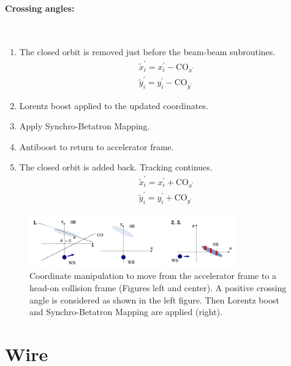 \paragraph{Crossing angles:}~\\
\begin{enumerate}
    \item The closed orbit is removed just before the beam-beam subroutines.
        \begin{eqnarray*}
            \tilde x^{\prime}_{i} = x^{\prime}_{i} - \mathrm{CO}_{x^{\prime}} \\
            \tilde y^{\prime}_{i} = y^{\prime}_{i} - \mathrm{CO}_{y^{\prime}}
        \end{eqnarray*}
    \item Lorentz boost applied to the updated coordinates.
    \item Apply Synchro-Betatron Mapping.
    \item Antiboost to return to accelerator frame.
    \item The closed orbit is added back. Tracking continues.
        \begin{eqnarray*}
            \tilde x^{\prime}_{i} = x^{\prime}_{i} + \mathrm{CO}_{x^{\prime}} \\
            \tilde y^{\prime}_{i} = y^{\prime}_{i} + \mathrm{CO}_{y^{\prime}}
        \end{eqnarray*}
\end{enumerate}
\begin{figure}[h]
    \begin{center}
    \includegraphics[width=0.8\textwidth]{figures/BB_xsing}
    \caption{Coordinate manipulation to move from the accelerator frame to a head-on collision frame (Figures left and center). A positive crossing angle is considered as shown in the left figure. Then Lorentz boost and Synchro-Betatron Mapping are applied (right).}
    \label{fig:BB_xsing}
    \end{center}
\end{figure}

\section{Wire} \label{sec:WIRE}

